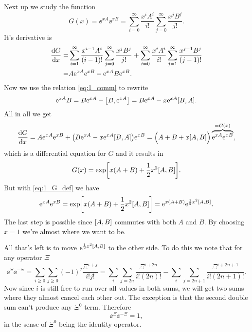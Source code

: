 \documentclass[11pt,letter, swedish, english
]{article}
\begin{document}
Next up we study the function
\begin{equation}\label{eq:1_G_def}
G(x)=\ee^{xA}\ee^{xB}
=\sum_{i=0}^\infty\frac{x^iA^i}{i!}\sum_{j=0}^\infty\frac{x^jB^j}{j!}.
\end{equation}
It's derivative is
\begin{equation}
\begin{aligned}
\dv{G}{x}=&
\sum_{i=1}^\infty\frac{x^{i-1}A^i}{(i-1)!}\sum_{j=0}^\infty\frac{x^jB^j}{j!}
+\sum_{i=0}^\infty\frac{x^iA^i}{i!}\sum_{j=1}^\infty\frac{x^{j-1}B^j}{(j-1)!}\\
=&A\mathrm{e}^{xA}\mathrm{e}^{xB} + \mathrm{e}^{xA}B\mathrm{e}^{xB}.
\end{aligned}
\end{equation}
Now we use the relation \eqref{eq:1_comm} to rewrite
\begin{equation}
\ee^{xA}B = B\ee^{xA}-\comm{B}{\ee^{xA}}
=B\ee^{xA}-x\ee^{xA}\comm{B}{A}.
\end{equation}
All in all we get
\vspace{-4mm}
\begin{equation}
\dv{G}{x}=A\ee^{xA}\ee^{xB}+\qty(B\ee^{xA}-x\ee^{xA}\comm{B}{A})\ee^{xB}
=\Big(A+B+x\comm{A}{B}\Big)\overbrace{\ee^{xA}\ee^{xB}}^{=G(x)},
\end{equation}
which is a differential equation for $G$ and it results in
\begin{equation}
G(x)=\exp[x(A+B)+\frac{1}{2}x^2\comm{A}{B}].
\end{equation}
But with \eqref{eq:1_G_def} we have
\begin{equation}\label{eq:1_almost}
\ee^{xA}\ee^{xB}=\exp[x(A+B)+\frac{1}{2}x^2\comm{A}{B}]
=\ee^{x(A+B)}\ee^{\frac{1}{2}x^2\comm{A}{B}}.
\end{equation}
The last step is possible since $\comm{A}{B}$ commutes with both $A$
and $B$. By choosing $x=1$ we're almost where we want to be. 

All that's left is to move $\ee^{\frac{1}{2}x^2\comm{A}{B}}$ to the
other side. To do this we note that for any operator $\Xi$
\begin{equation}
\ee^{\Xi}\ee^{-\Xi}=\sum_{i\ge0}\sum_{j\ge0}(-1)^j\frac{\Xi^{i+j}}{i!j!}
=\sum_i\sum_{j=2n}\frac{\Xi^{i+2n}}{i!(2n)!}
-\sum_i\sum_{j=2n+1}\frac{\Xi^{i+2n+1}}{i!(2n+1)!}.
\end{equation}
Now since $i$ is still free to run over all values in both sums, we
will get two sums where they almost cancel each other out. The
exception is that the second double sum can't produce any $\Xi^0$
term. Therefore
\begin{equation}
\ee^{\Xi}\ee^{-\Xi}=1,
\end{equation}
in the sense of $\Xi^0$ being the identity operator. 
\end{document}

